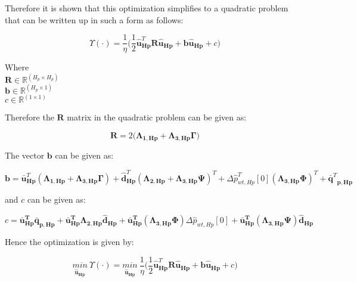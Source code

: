 Therefore it is shown that this optimization simplifies to a quadratic problem that can be written up in such a form as follows:

\begin{equation}
  \Upsilon(\cdot) = \frac{1}{\eta}\Big( \frac{1}{2} \bm{\hat{u}}_{\bm{Hp}}^{T} \bm{R} \bm{\hat{u}}_{\bm{Hp}} + \bm{b} \bm{\hat{u}}_{\bm{Hp}} + c \Big)
\end{equation}

\begin{minipage}[t]{0.28\textwidth}
Where\\
\hspace*{8mm} $\bm{R} \in \pmb{\mathbb{R}}^{(H_p \times H_p)} $ \\
\hspace*{8mm} $\bm{b} \in \pmb{\mathbb{R}}^{(H_p \times 1)} $ \\
\hspace*{8mm} $c \in \mathbb{R}^{(1 \times 1)} $
\end{minipage}

Therefore the $\bm{R}$ matrix in the quadratic problem can be given as:

\begin{equation}
  \bm{R} = 2\Big(\bm{\Lambda}_{\bm{1,Hp}} + \bm{\Lambda}_{\bm{3,Hp}} \bm{\Gamma}\Big) 
\end{equation}

The vector $\bm{b}$ can be given as:

\begin{equation}
\!\! \bm{b} = \bm{\bar{u}}_{\bm{Hp}}^{T}(\bm{\Lambda}_{\bm{1,Hp}} \!+ \!\bm{\Lambda}_{\bm{3,Hp}} \bm{\Gamma} )\! + \!\bm{\hat{d}}_{\bm{Hp}}^{T}(\bm{\Lambda}_{\bm{2,Hp}}\! + \!\bm{\Lambda}_{\bm{3,Hp}} \bm{\Psi} )^{T}
  + \Delta \hat{p}_{wt,Hp}^{T}[0] (\bm{\Lambda}_{\bm{3,Hp}} \bm{\Phi})^{T} + {\bm{\bar{q}}^{T}}_{\bm{p,Hp}}
\end{equation}

and $c$ can be given as:

\begin{equation}
\!\! c = \bm{\bar{u}_{Hp}^T} \bm{\bar{q}_{p,Hp}} + \bm{\bar{u}_{Hp}^T} \bm{\Lambda}_{\bm{2,Hp}} \bm{\hat{d}}_{\bm{Hp}} +  \bm{\bar{u}_{Hp}^T} (\bm{\Lambda}_{\bm{3,Hp}} \bm{\Phi}) \Delta \hat{p}_{wt,Hp}[0] + \bm{\bar{u}_{Hp}^T} (\bm{\Lambda}_{\bm{3,Hp}} \bm{\Psi})  \bm{\hat{d}_{Hp}}
\end{equation}

Hence the optimization is given by:

\begin{equation}
\underset{\bm{\hat{u}_{Hp}}}{min} \:  \Upsilon(\cdot) = \underset{\bm{\hat{u}_{Hp}}}{min} \:  \frac{1}{\eta}\bigg( \frac{1}{2} \bm{\hat{u}}_{\bm{Hp}}^{T} \bm{R} \bm{\hat{u}}_{\bm{Hp}} + \bm{b} \bm{\hat{u}}_{\bm{Hp}} + c \bigg)
\label{eq:obj_final}
\end{equation}